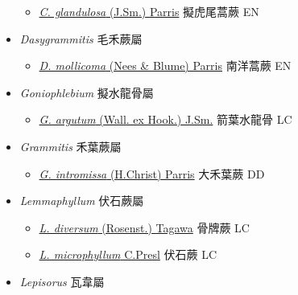 \begin{itemize}
  \begin{itemize}
        \item[] \href{http://www.theplantlist.org/tpl1.1/search?q=Chrysogrammitis+glandulosa}{\textit{C. glandulosa} (J.Sm.) Parris}   擬虎尾蒿蕨   EN
  \end{itemize}
 \item[    ] \textit{Dasygrammitis} 毛禾蕨屬
                                
  \begin{itemize}
        \item[] \href{http://www.theplantlist.org/tpl1.1/search?q=Dasygrammitis+mollicoma}{\textit{D. mollicoma} (Nees \& Blume) Parris}   南洋蒿蕨   EN
  \end{itemize}
 \item[    ] \textit{Goniophlebium} 擬水龍骨屬
                                
  \begin{itemize}
        \item[] \href{http://www.theplantlist.org/tpl1.1/search?q=Goniophlebium+argutum}{\textit{G. argutum} (Wall. ex Hook.) J.Sm.}   箭葉水龍骨   LC
  \end{itemize}
 \item[    ] \textit{Grammitis} 禾葉蕨屬
                                
  \begin{itemize}
        \item[] \href{http://www.theplantlist.org/tpl1.1/search?q=Grammitis+intromissa}{\textit{G. intromissa} (H.Christ) Parris}   大禾葉蕨   DD
  \end{itemize}
 \item[    ] \textit{Lemmaphyllum} 伏石蕨屬
                                
  \begin{itemize}
        \item[] \href{http://www.theplantlist.org/tpl1.1/search?q=Lemmaphyllum+diversum}{\textit{L. diversum} (Rosenst.) Tagawa}   骨牌蕨   LC
        \item[] \href{http://www.theplantlist.org/tpl1.1/search?q=Lemmaphyllum+microphyllum}{\textit{L. microphyllum} C.Presl}   伏石蕨   LC
  \end{itemize}
 \item[    ] \textit{Lepisorus} 瓦韋屬
                                

\end{itemize}
